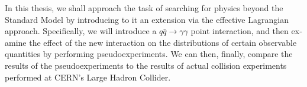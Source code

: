 \begin{english}
In this thesis, we shall approach the task of searching for physics beyond the Standard Model by introducing to it an extension via the effective Lagrangian approach. Specifically, we will introduce a $q\bar q\rightarrow\gamma\gamma$ point interaction, and then examine the effect of the new interaction on the distributions of certain observable quantities by performing pseudoexperiments. We can then, finally, compare the results of the pseudoexperiments to the results of actual collision experiments performed at CERN's Large Hadron Collider.

\renewcommand{\bibname}{References}




\end{english}
